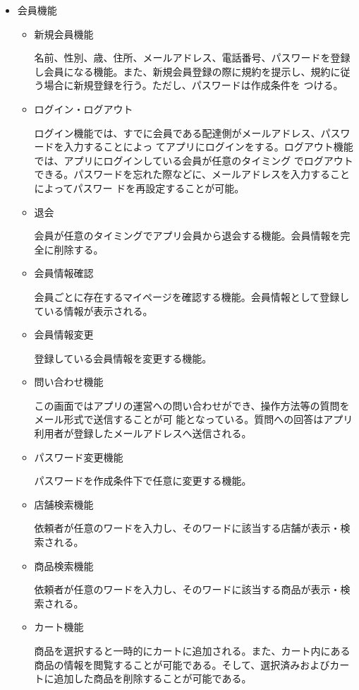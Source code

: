\begin{itemize}
  \item 会員機能
    \begin{itemize}
        \item 新規会員機能
        
        名前、性別、歳、住所、メールアドレス、電話番号、パスワードを登録し会員になる機能。また、新規会員登録の際に規約を提示し、規約に従う場合に新規登録を行う。ただし、パスワードは作成条件を つける。
        \item ログイン・ログアウト
        
        ログイン機能では、すでに会員である配達側がメールアドレス、パスワードを入力することによっ てアプリにログインをする。ログアウト機能では、アプリにログインしている会員が任意のタイミング でログアウトできる。パスワードを忘れた際などに、メールアドレスを入力することによってパスワー ドを再設定することが可能。
        \item 退会
        
        会員が任意のタイミングでアプリ会員から退会する機能。会員情報を完全に削除する。
        \item 会員情報確認

        会員ごとに存在するマイページを確認する機能。会員情報として登録している情報が表示される。
        \item 会員情報変更
        
        登録している会員情報を変更する機能。
        \item 問い合わせ機能
        
        この画面ではアプリの運営への問い合わせができ、操作方法等の質問をメール形式で送信することが可 能となっている。質問への回答はアプリ利用者が登録したメールアドレスへ送信される。
        \item パスワード変更機能
        
        パスワードを作成条件下で任意に変更する機能。
        \item 店舗検索機能
        
        依頼者が任意のワードを入力し、そのワードに該当する店舗が表示・検索される。
        
        \item 商品検索機能
        
        依頼者が任意のワードを入力し、そのワードに該当する商品が表示・検索される。

        \item カート機能

        商品を選択すると一時的にカートに追加される。また、カート内にある商品の情報を閲覧することが可能である。そして、選択済みおよびカートに追加した商品を削除することが可能である。


\end{itemize}
\end{itemize}
